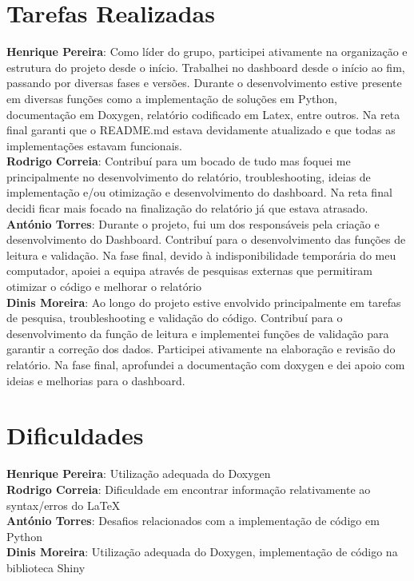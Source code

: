 \documentclass[11pt,a4paper]{report}
\begin{document}
\section{Tarefas Realizadas}
\textbf{Henrique Pereira}: Como líder do grupo, participei ativamente na organização e estrutura do projeto desde o início. Trabalhei no dashboard desde o início ao fim, passando por diversas fases e versões. Durante o desenvolvimento estive presente em diversas funções como a implementação de soluções em Python, documentação em Doxygen, relatório codificado em Latex, entre outros. Na reta final garanti que o README.md estava devidamente atualizado e que todas as implementações estavam funcionais. \\
\textbf{Rodrigo Correia}: Contribuí para um bocado de tudo mas foquei me principalmente no desenvolvimento do relatório, troubleshooting, ideias de implementação e/ou otimização e desenvolvimento do dashboard. Na reta final decidi ficar mais focado na finalização do relatório já que estava atrasado. \\
\textbf{António Torres}: Durante o projeto, fui um dos  responsáveis pela criação e desenvolvimento do Dashboard. Contribuí para o desenvolvimento das funções de leitura e validação. Na fase final, devido à indisponibilidade temporária do meu computador, apoiei a equipa através de pesquisas externas que permitiram otimizar o código e melhorar o relatório \\
\textbf{Dinis Moreira}: Ao longo do projeto estive envolvido principalmente em tarefas de pesquisa, troubleshooting e validação do código. Contribuí para o desenvolvimento da função de leitura e implementei funções de validação para garantir a correção dos dados. Participei ativamente na elaboração e revisão do relatório. Na fase final, aprofundei a documentação com doxygen e dei apoio com ideias e melhorias para o dashboard. \\

\section{Dificuldades}
\textbf{Henrique Pereira}: Utilização adequada do Doxygen \\
\textbf{Rodrigo Correia}: Dificuldade em encontrar informação relativamente ao syntax/erros do LaTeX \\
\textbf{António Torres}: Desafios relacionados com a implementação de código em Python \\
\textbf{Dinis Moreira}: Utilização adequada do Doxygen, implementação de código na biblioteca Shiny \\
\newpage
\end{document}

